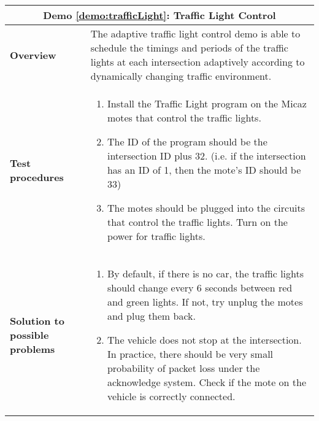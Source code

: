 \begin{center}
	\begin{tabular}{ | p{2cm} | p{10cm} | }
		\hline
		\multicolumn{2}{|c|}{\textbf{Demo \ref{demo:trafficLight}: Traffic Light Control}} \\ \hline
		\textbf{Overview} &  The adaptive traffic light control demo is able to schedule the timings and periods of the traffic lights at each intersection adaptively according to dynamically changing traffic environment. \\ \hline
		\textbf{Test procedures} &
		\begin{enumerate}
		\item	Install the Traffic Light program on the Micaz motes that control the traffic lights.
 		\item The ID of the program should be the intersection ID plus 32. (i.e. if the intersection has an ID of 1, then the mote's ID should be 33)
 		\item The motes should be plugged into the circuits that control the traffic lights. Turn on the power for traffic lights.
		\end{enumerate} \\ \hline
		\textbf{Solution to possible problems} &
		\begin{enumerate}
		\item By default, if there is no car, the traffic lights should change every 6 seconds between red and green lights. If not, try unplug the motes and plug them back.
		\item The vehicle does not stop at the intersection. In practice, there should be very small probability of packet loss under the acknowledge system. Check if the mote on the vehicle is correctly connected.
		\end{enumerate}  \\
		\hline
	\end{tabular}
\end{center}

